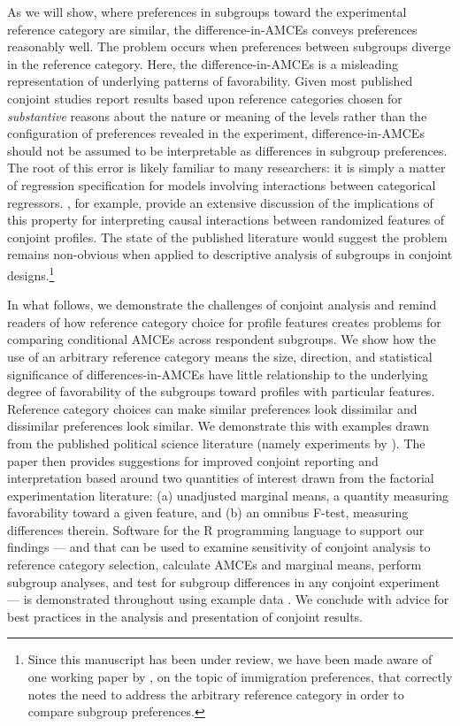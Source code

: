 \documentclass[a4paper,12pt]{article}\usepackage[]{graphicx}\usepackage[]{color}
\begin{document}
As we will show, where preferences in subgroups toward the experimental reference category are similar, the difference-in-AMCEs conveys preferences reasonably well. The problem occurs when preferences between subgroups diverge in the reference category. Here, the difference-in-AMCEs is a misleading representation of underlying patterns of favorability. Given most published conjoint studies report results based upon reference categories chosen for \textit{substantive} reasons about the nature or meaning of the levels rather than the configuration of preferences revealed in the experiment, difference-in-AMCEs should not be assumed to be interpretable as differences in subgroup preferences. The root of this error is likely familiar to many researchers: it is simply a matter of regression specification for models involving interactions between categorical regressors. \citet{EgamiImai2018}, for example, provide an extensive discussion of the implications of this property for interpreting causal interactions between randomized features of conjoint profiles. The state of the published literature would suggest the problem remains non-obvious when applied to descriptive analysis of subgroups in conjoint designs.\footnote{Since this manuscript has been under review, we have been made aware of one working paper by \citet{ClaytonFerwerdaHoriuchi2018}, on the topic of immigration preferences, that correctly notes the need to address the arbitrary reference category in order to compare subgroup preferences.}

In what follows, we demonstrate the challenges of conjoint analysis and remind readers of how reference category choice for profile features creates problems for comparing conditional AMCEs across respondent subgroups. We show how the use of an arbitrary reference category means the size, direction, and statistical significance of differences-in-AMCEs have little relationship to the underlying degree of favorability of the subgroups toward profiles with particular features. Reference category choices can make similar preferences look dissimilar and dissimilar preferences look similar. We demonstrate this with examples drawn from the published political science literature (namely experiments by \citealt{HainmuellerHopkinsYamamoto2014, BechtelScheve2013, TeeleKallaRosenbluth2018}). The paper then provides suggestions for improved conjoint reporting and interpretation based around two quantities of interest drawn from the factorial experimentation literature: (a) unadjusted marginal means, a quantity measuring favorability toward a given feature, and (b) an omnibus F-test, measuring differences therein. Software for the R programming language to support our findings --- and that can be used to examine sensitivity of conjoint analysis to reference category selection, calculate AMCEs and marginal means, perform subgroup analyses, and test for subgroup differences in any conjoint experiment \citep{Leeper2018cregg} --- is demonstrated throughout using example data \citep{LeeperHoboltTilley2019}. We conclude with advice for best practices in the analysis and presentation of conjoint results.
\end{document}

